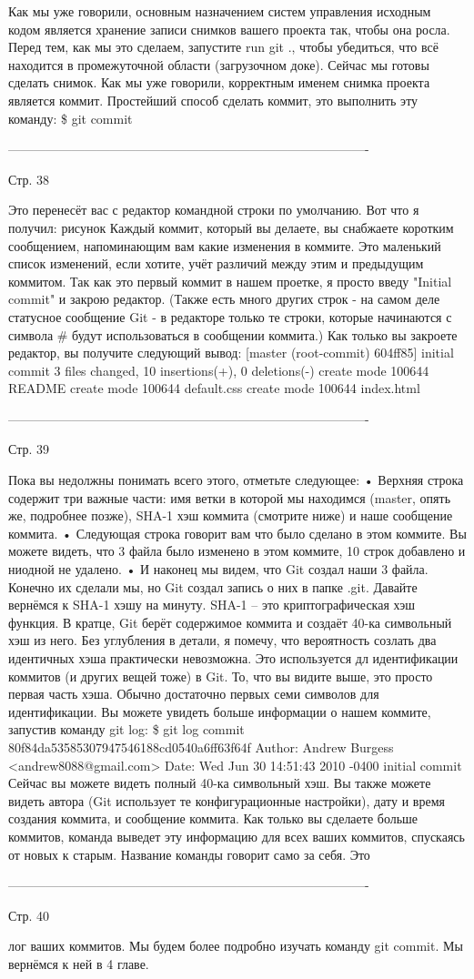 Как мы уже говорили, основным назначением систем управления исходным кодом является
хранение записи снимков вашего проекта так, чтобы она росла. Перед тем, как мы это 
сделаем, запустите run git ., чтобы убедиться, что всё находится в промежуточной 
области (загрузочном доке). Сейчас мы готовы сделать снимок.
Как мы уже говорили, корректным именем снимка проекта является коммит. Простейший
способ сделать коммит, это выполнить эту команду:
\$ git commit

-------------------------------------------------------------------------------------

Стр. 38

Это перенесёт вас с редактор командной строки по умолчанию. Вот что я получил:
{рисунок}
Каждый коммит, который вы делаете, вы снабжаете коротким сообщением, напоминающим
вам какие изменения в коммите. Это маленький список изменений, если хотите, учёт 
различий между этим и предыдущим коммитом. Так как это первый коммит в нашем проетке,
я просто введу "Initial commit" и закрою редактор. (Также есть много других строк - на
самом деле статусное сообщение Git - в редакторе только те строки, которые начинаются 
с символа # будут использоваться в сообщении коммита.)
Как только вы закроете редактор, вы получите следующий вывод:
[master (root-commit) 604ff85] initial commit
3 files changed, 10 insertions(+), 0 deletions(-)
create mode 100644 README
create mode 100644 default.css
create mode 100644 index.html

-------------------------------------------------------------------------------------

Стр. 39

Пока вы недолжны понимать всего этого, отметьте следующее:
        • Верхняя строка содержит три важные части: имя ветки в которой мы находимся
        (master, опять же, подробнее позже), SHA-1 хэш коммита (смотрите ниже) и наше
        сообщение коммита.
        • Следующая строка говорит вам что было сделано в этом коммите. Вы можете
        видеть, что 3 файла было изменено в этом коммите, 10 строк добавлено и ниодной
        не удалено.
        • И наконец мы видем, что Git создал наши 3 файла. Конечно их сделали мы, но Git
        создал запись о них в папке .git.
Давайте вернёмся к SHA-1 хэшу на минуту. SHA-1 -- это криптографическая хэш функция. В
кратце, Git берёт содержимое коммита и создаёт 40-ка символьный хэш из него. Без 
углубления в детали, я помечу, что вероятность созлать два идентичных хэша практически
невозможна. Это используется дл идентификации коммитов (и других вещей тоже) в Git. То,
что вы видите выше, это просто первая часть хэша. Обычно достаточно первых семи символов
для идентификации.
Вы можете увидеть больше информации о нашем коммите, запустив команду git log:
\$ git log
commit 80f84da53585307947546188cd0540a6ff63f64f
Author: Andrew Burgess <andrew8088@gmail.com>
Date:
Wed Jun 30 14:51:43 2010 -0400
initial commit
Сейчас вы можете видеть полный 40-ка символьный хэш. Вы также можете видеть автора (Git
использует те конфигурационные настройки), дату и время создания коммита, и сообщение
коммита. Как только вы сделаете больше коммитов, команда выведет эту информацию для всех
ваших коммитов, спускаясь от новых к старым. Название команды говорит само за себя. Это

-------------------------------------------------------------------------------------

Стр. 40

лог ваших коммитов. Мы будем более подробно изучать команду git commit. Мы вернёмся к
ней в 4 главе.